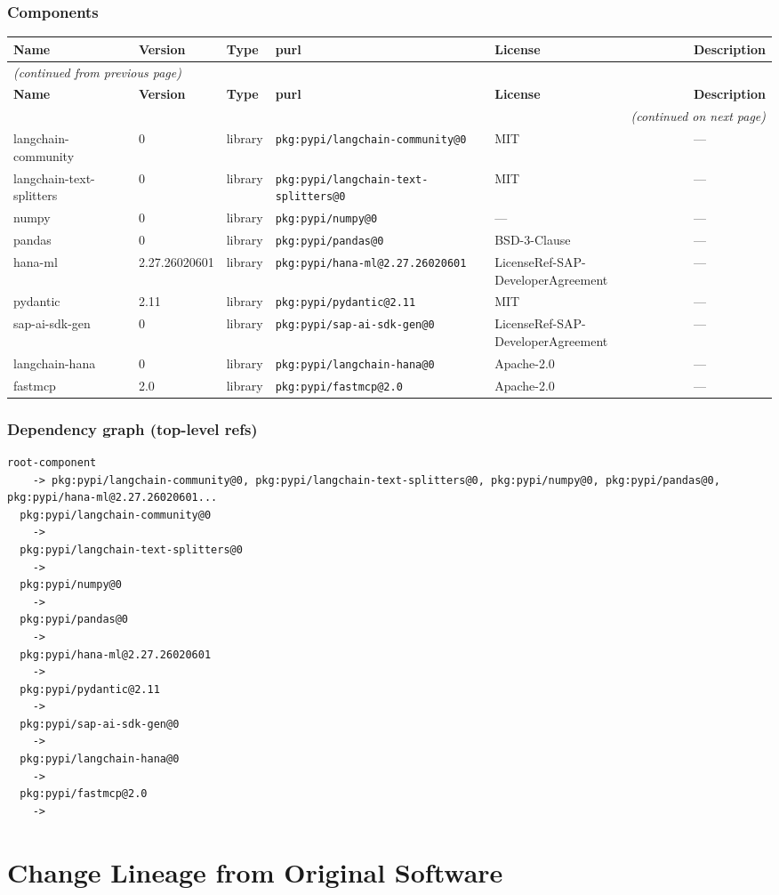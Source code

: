 \documentclass[11pt,a4paper]{article}
\begin{document}
\subsubsection*{Components}
\begin{longtable}{|p{4cm}|p{2cm}|p{1.6cm}|p{5cm}|p{1.5cm}|p{3.5cm}|}
\toprule
\rowcolor{sbomhdr}\textbf{Name} & \textbf{Version} & \textbf{Type} & \textbf{purl} & \textbf{License} & \textbf{Description} \\
\midrule
\endfirsthead
\multicolumn{6}{l}{\small\itshape (continued from previous page)} \\
\toprule
\rowcolor{sbomhdr}\textbf{Name} & \textbf{Version} & \textbf{Type} & \textbf{purl} & \textbf{License} & \textbf{Description} \\
\midrule
\endhead
\midrule
\multicolumn{6}{r}{\small\itshape (continued on next page)} \\
\endfoot
\bottomrule
\endlastfoot
\raggedright langchain-community & 0 & library & \small\texttt{pkg:pypi/langchain-community@0} & MIT & \small — \\
\raggedright langchain-text-splitters & 0 & library & \small\texttt{pkg:pypi/langchain-text-splitters@0} & MIT & \small — \\
\raggedright numpy & 0 & library & \small\texttt{pkg:pypi/numpy@0} & — & \small — \\
\raggedright pandas & 0 & library & \small\texttt{pkg:pypi/pandas@0} & BSD-3-Clause & \small — \\
\raggedright hana-ml & 2.27.26020601 & library & \small\texttt{pkg:pypi/hana-ml@2.27.26020601} & LicenseRef-SAP-DeveloperAgreement & \small — \\
\raggedright pydantic & 2.11 & library & \small\texttt{pkg:pypi/pydantic@2.11} & MIT & \small — \\
\raggedright sap-ai-sdk-gen & 0 & library & \small\texttt{pkg:pypi/sap-ai-sdk-gen@0} & LicenseRef-SAP-DeveloperAgreement & \small — \\
\raggedright langchain-hana & 0 & library & \small\texttt{pkg:pypi/langchain-hana@0} & Apache-2.0 & \small — \\
\raggedright fastmcp & 2.0 & library & \small\texttt{pkg:pypi/fastmcp@2.0} & Apache-2.0 & \small — \\
\end{longtable}

\subsubsection*{Dependency graph (top-level refs)}
\begin{lstlisting}[style=depgraph]
  root-component
    -> pkg:pypi/langchain-community@0, pkg:pypi/langchain-text-splitters@0, pkg:pypi/numpy@0, pkg:pypi/pandas@0, pkg:pypi/hana-ml@2.27.26020601...
  pkg:pypi/langchain-community@0
    -> 
  pkg:pypi/langchain-text-splitters@0
    -> 
  pkg:pypi/numpy@0
    -> 
  pkg:pypi/pandas@0
    -> 
  pkg:pypi/hana-ml@2.27.26020601
    -> 
  pkg:pypi/pydantic@2.11
    -> 
  pkg:pypi/sap-ai-sdk-gen@0
    -> 
  pkg:pypi/langchain-hana@0
    -> 
  pkg:pypi/fastmcp@2.0
    -> 
\end{lstlisting}

\newpage
\section{Change Lineage from Original Software}
\end{document}
